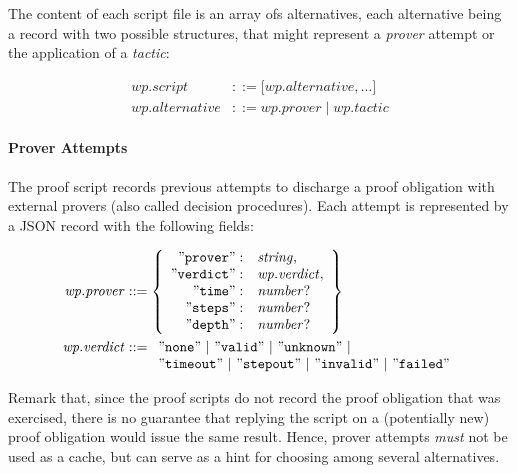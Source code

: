 The content of each script file is an array ofs alternatives, each alternative being a record with
two possible structures, that might represent a \textit{prover} attempt or the application of a
\textit{tactic}:

\begin{align*}
    \mathit{wp.script} &::= \mathtt{[} \mathit{wp.alternative} , \ldots \mathtt{]} \\
    \mathit{wp.alternative} &::= \mathit{wp.prover} \;|\; \mathit{wp.tactic}
\end{align*}

\paragraph{Prover Attempts} The proof script records previous attempts to discharge a proof obligation
with external provers (also called decision procedures).
Each attempt is represented by a \textsf{JSON} record with the following fields:

\begin{align*}
    \mathit{wp.prover} &::=
    \left\{
    \begin{array}{rl}
        \mathtt{"prover"}  :& \mathit{string}, \\
        \mathtt{"verdict"} :& \mathit{wp.verdict}, \\ 
        \mathtt{"time"}    :& \mathit{number}? \\ 
        \mathtt{"steps"}   :& \mathit{number}? \\ 
        \mathtt{"depth"}   :& \mathit{number}? \\ 
    \end{array}
    \right\} \\
    \mathit{wp.verdict} &::=
    \begin{array}[t]{l}
    \mathtt{"none"} ~|~ 
    \mathtt{"valid"} ~|~ 
    \mathtt{"unknown"} ~|~ \\
    \mathtt{"timeout"} ~|~ 
    \mathtt{"stepout"} ~|~ 
    \mathtt{"invalid"} ~|~
    \mathtt{"failed"}
    \end{array}
\end{align*}

Remark that, since the proof scripts do not record the proof obligation that was exercised, there is no
guarantee that replying the script on a (potentially new) proof obligation would issue the same result.
Hence, prover attempts \emph{must} not be used as a cache, but can serve as a hint for choosing among
several alternatives.


